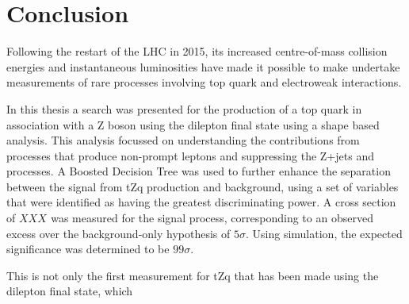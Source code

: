 \chapter{Conclusion}\label{chapter:conclusion}
Following the restart of the LHC in 2015, its increased centre-of-mass collision energies and instantaneous luminosities have made it possible to make undertake measurements of rare processes involving top quark and electroweak interactions.

In this thesis a search was presented for the production of a top quark in association with a Z boson using the dilepton final state using a shape based analysis.
This analysis focussed on understanding the contributions from processes that produce non-prompt leptons and suppressing the Z+jets and \ttbar processes.
A Boosted Decision Tree was used to further enhance the separation between the signal from tZq production and background, using a set of variables that were identified as having the greatest discriminating power.
A cross section of $XXX^{}_{}$ was measured for the signal process, corresponding to an observed excess over the background-only hypothesis of $5\sigma$.
Using simulation, the expected significance was determined to be $99 \sigma$.

This is not only the first measurement for tZq that has been made using the dilepton final state, which 

%
%
%
%
%


